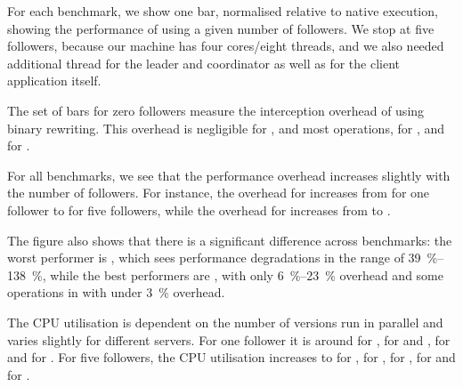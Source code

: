 For each benchmark, we show one bar, normalised relative to native execution,
showing the performance of \varan using a given number of followers.  We stop
at five followers, because our machine has four cores/eight threads, and we
also needed additional thread for the leader and coordinator as well as for the
client application itself.

The set of bars for zero followers measure the interception overhead
of \varan using binary rewriting.  This overhead is negligible for
\lighttpdtwo, \memcached and most \redis operations, \nginxIntercept for
\nginx, and \beanstalkdIntercept for \beanstalkd.

For all benchmarks, we see that the performance overhead increases slightly
with the number of followers. For instance, the overhead for \beanstalkd
increases from \beanstalkdOneFollower for one follower to
\beanstalkdFiveFollowers for five followers, while the overhead for \memcached
increases from \memcachedOneFollower to \memcachedFiveFollowers.

The figure also shows that there is a significant difference across benchmarks:
the worst performer is \redis, which sees performance degradations in the range
of \SIrange{39}{138}{\percent}, while the best performers are \lighttpdtwo,
with only \SIrange{6}{23}{\percent} overhead and some operations in \redis with
under \SI{3}{\percent} overhead.

The CPU utilisation is dependent on the number of versions run in parallel and
varies slightly for different servers. For one follower it is around
\memcachedOneCpuFollower for \memcached, \lighttpdtwoCpuOneFollower for
\lighttpdtwo and \nginx, \redisCpuOneFollower for \redis and
\beanstalkdCpuOneFollower for \beanstalkd. For five followers, the CPU
utilisation increases to \memcachedCpuFiveFollowers for \memcached,
\beanstalkdCpuFiveFollowers for \beanstalkd, \redisCpuFiveFollowers for \redis,
\nginxCpuFiveFollowers for \nginx and \lighttpdtwoCpuFiveFollowers for
\lighttpdtwo.
